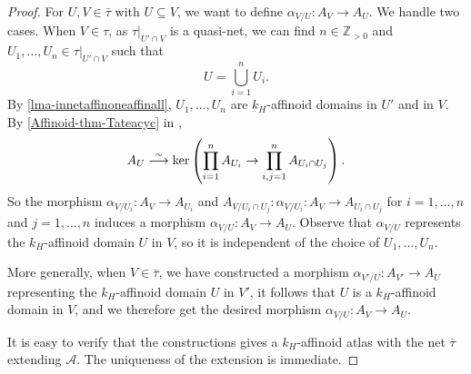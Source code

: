 \begin{proof}
    For $U,V\in \bar{\tau}$ with $U\subseteq V$, we want to define $\alpha_{V/U}:A_V\rightarrow A_U$. We handle two cases. When $V\in \tau$, as $\tau|_{U'\cap V}$ is a quasi-net, we can find $n\in \mathbb{Z}_{>0}$ and $U_1,\ldots,U_n\in \tau|_{U'\cap V}$ such that
    \[
        U=\bigcup_{i=1}^n U_i.  
    \]
    By \cref{lma-innetaffinoneaffinall}, $U_1,\ldots,U_n$ are $k_H$-affinoid domains in $U'$ and in $V$. By \cref{Affinoid-thm-Tateacyc} in ,
    \[
        A_U\stackrel{\sim}{\longrightarrow} \ker \left( \prod_{i=1}^n A_{U_i}\rightarrow \prod_{i,j=1}^n A_{U_i\cap U_j} \right).  
    \]
    So the morphism $\alpha_{V/U_i}:A_V\rightarrow A_{U_i}$ and $A_{V/U_{i}\cap U_j}:\alpha_{V/U_i}:A_V\rightarrow A_{U_i\cap U_j}$ for $i=1,\ldots,n$ and $j=1,\ldots,n$ induces a morphism $\alpha_{V/U}:A_V\rightarrow A_U$. Observe that $\alpha_{V/U}$ represents the $k_H$-affinoid domain $U$ in $V$, so it is independent of the choice of $U_1,\ldots,U_n$.

    More generally, when $V\in \bar{\tau}$, we have constructed a morphism $\alpha_{V'/U}:A_{V'}\rightarrow A_U$ representing the $k_H$-affinoid domain $U$ in $V'$, it follows that $U$ is a $k_H$-affinoid domain in $V$, and we therefore get the desired morphism $\alpha_{V/U}:A_V\rightarrow A_U$.

    It is easy to verify that the constructions gives a $k_H$-affinoid atlas with the net $\bar{\tau}$ extending $\mathcal{A}$. The uniqueness of the extension is immediate.
\end{proof}

